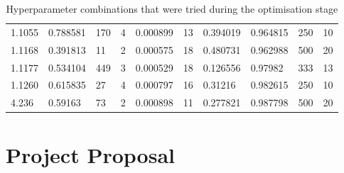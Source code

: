 \documentclass[12pt,a4paper,twoside,openright]{report}
\begin{document}
\begin{table}
\begin{tabular}{p{1.6cm}|p{1.8cm}p{1.7cm}p{1.9cm}p{1.9cm}p{1.9cm}p{1.9cm}p{1.9cm}p{1.7cm}p{1.9cm}}
1.1055				&0.788581                               & 170                                    & 4                                       & 0.000899                                        & 13                                           & 0.394019                                & 0.964815                                    & 250                                    & 10                                           \bigstrut\\
1.1168				&0.391813                               & 11                                     & 2                                       & 0.000575                                        & 18                                           & 0.480731                                & 0.962988                                    & 500                                    & 20                                           \bigstrut\\
1.1177				&0.534104                               & 449                                    & 3                                       & 0.000529                                        & 18                                           & 0.126556                                & 0.97982                                     & 333                                    & 13                                           \bigstrut\\
1.1260				&0.615835                               & 27                                     & 4                                       & 0.000797                                        & 16                                           & 0.31216                                 & 0.982615                                    & 250                                    & 10             \bigstrut\\
4.236				&0.59163                                & 73                                     & 2                                       & 0.000898                                        & 11                                           & 0.277821                                & 0.987798                                    & 500                                    & 20             \bigstrut\\ \bottomrule                             
\end{tabular}
\caption{Hyperparameter combinations that were tried during the optimisation stage}
\label{table:appLSTMHyper}
\end{table}

\chapter{Project Proposal}
\label{appendix:projProp}
\end{document}
